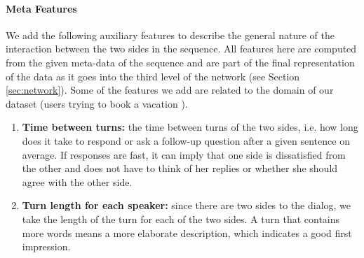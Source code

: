 


\paragraph*{Meta Features}
We add the following auxiliary features 
to describe the general nature 
of the interaction between the two sides 
in the sequence. All features here 
are computed from the given meta-data of the sequence and 
are part of the final representation of the data as it goes into the 
third level of the network (see Section \ref{sec:network}). 
Some of the features we add are related to the domain of our dataset 
(users trying to book a vacation \cite{frames}).

\begin{enumerate}
\item {\bf Time between turns: } the time between 
turns of the two sides, i.e. how long does it take to respond or ask a follow-up 
question after a given sentence on average. 
If responses are fast, it can imply that one side is dissatisfied 
from the other and does not have to think of her replies or whether 
she should agree with the other side.\label{itm:between}


\item {\bf Turn length for each speaker: } since there are two sides to the dialog, 
we take the length of the turn for each of the two sides. 
A turn that contains more words means a more elaborate description, which indicates 
a good first impression.\label{itm:sent}



\end{enumerate} 

